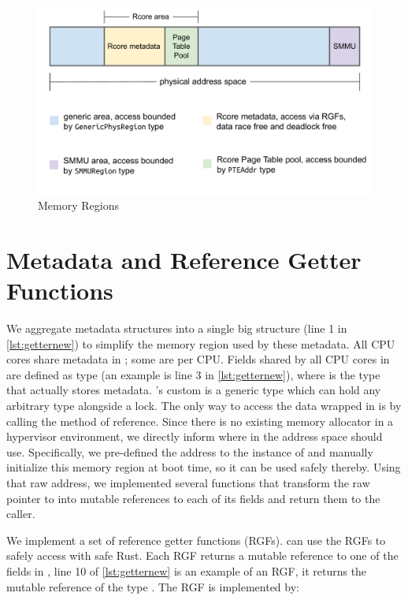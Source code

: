 \begin{figure}[ht]
\centering
\includegraphics[width=1.00\textwidth]{figures/regions.pdf}
\caption{Memory Regions}
\label{fig:regions}
\end{figure}

\section{\rustcore{} Metadata and Reference Getter Functions}
We aggregate \rustcore{} metadata structures
into a single big structure 
(line 1 in \autoref{lst:getternew})
to simplify the memory region used by these metadata.
All CPU cores share metadata in \rustcore{}; some are per CPU.
Fields shared by all CPU cores in  are defined as type 
(an example is line 3 in \autoref{lst:getternew}),
where  is the type that actually stores \rustcore{} metadata.
\rustcore{}'s custom \code{\lock{}} is a generic type which can hold any
arbitrary type alongside a lock.
The only way to access the data wrapped in \code{\lock{}} is by calling the
 method of \code{\lock{}} reference.
Since there is no existing memory allocator in a hypervisor environment,
we directly inform where in the address space \rustcore{} should use.
Specifically, we pre-defined the address to the instance of 
and manually initialize this memory region at boot time,
so it can be used safely thereby.
Using that raw address, we implemented several functions that
transform the raw pointer to  into mutable references to
each of its fields and return them to the caller.

We implement a set of reference getter functions (RGFs). \rustcore{}
can use the RGFs to safely access  with safe Rust.
Each RGF returns a mutable reference to one of the fields in ,
line 10 of \autoref{lst:getternew} is an example of an RGF, it returns the mutable reference
of the type . The RGF is implemented by:

